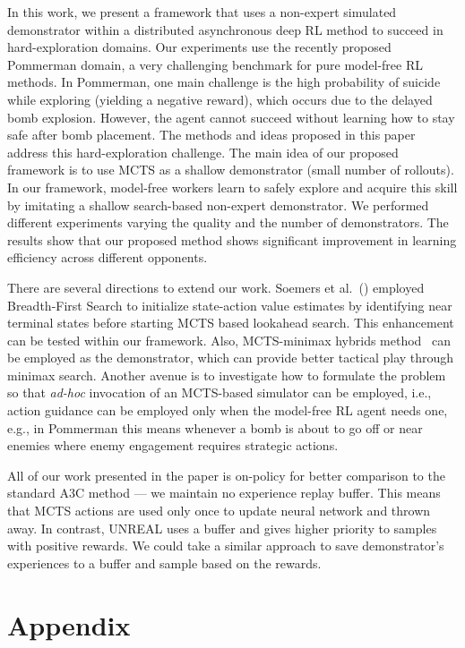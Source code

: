 \documentclass[letterpaper]{article}
\begin{document}
In this work, we present a framework that uses a non-expert simulated demonstrator within a distributed asynchronous deep RL method to succeed in hard-exploration domains. Our experiments use the recently proposed Pommerman domain, a very challenging benchmark for pure model-free RL methods. In Pommerman, one main challenge is the high probability of suicide while exploring (yielding a negative reward), which occurs due to the delayed bomb explosion. However, the agent cannot succeed without learning how to stay safe after bomb placement. The methods and ideas proposed in this paper address this hard-exploration challenge. The main idea of our proposed framework is to use MCTS as a shallow demonstrator (small number of rollouts). In our framework, model-free workers learn to safely explore and acquire this skill by imitating a shallow search-based non-expert demonstrator. We performed different experiments varying the quality and the number of demonstrators. The results show that our proposed method shows significant improvement in learning efficiency across different opponents.

There are several directions to extend our work. Soemers et al.~(\citeyear{soemers2016enhancements}) employed Breadth-First Search to initialize state-action value estimates by identifying near terminal states before starting MCTS based lookahead search. This enhancement can be tested within our framework. Also, MCTS-minimax hybrids method~\cite{baier2018mcts} can be employed as the demonstrator, which can provide better tactical play through minimax search. Another avenue is to investigate how to formulate the problem so that \emph{ad-hoc} invocation of an MCTS-based simulator can be employed, i.e., action guidance can be employed only when the model-free RL agent needs one, e.g., in Pommerman this means whenever a bomb is about to go off or near enemies where enemy engagement requires strategic actions.

All of our work presented in the paper is on-policy for better comparison to the standard A3C method --- we maintain no experience replay buffer. This means that MCTS actions are used only once to update neural network and thrown away. In contrast, UNREAL uses a buffer and gives higher priority to samples with positive rewards. We could take a similar approach to save demonstrator's experiences to a buffer and sample based on the rewards.

\section*{Appendix}
\end{document}
